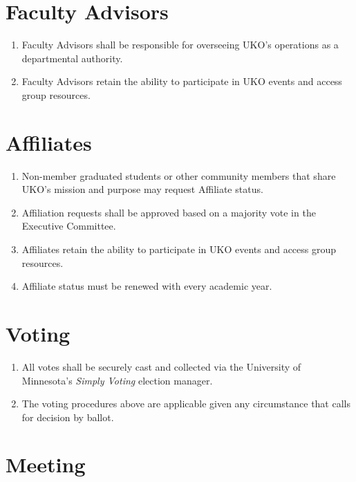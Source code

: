 \documentclass[12pt,executivepaper]{article}
\begin{document}
\section{Faculty Advisors}

\begin{enumerate}
    \item Faculty Advisors shall be responsible for overseeing UKO's operations
          as a departmental authority.
    \item Faculty Advisors retain the ability to participate in UKO events and
          access group resources.
\end{enumerate}

\section{Affiliates}

\begin{enumerate}
    \item Non-member graduated students or other community members that
          share UKO's mission and purpose may request Affiliate status.
    \item Affiliation requests shall be approved based on a majority vote in
          the Executive Committee.
    \item Affiliates retain the ability to participate in UKO events and
          access group resources.
    \item Affiliate status must be renewed with every academic year.
\end{enumerate}

\section{Voting}

\begin{enumerate}
    \item All votes shall be securely cast and collected via the University of
          Minnesota's \textit{Simply Voting} election manager.
    \item The voting procedures above are applicable given any circumstance
          that calls for decision by ballot.
\end{enumerate}

\section{Meeting}
\end{document}
